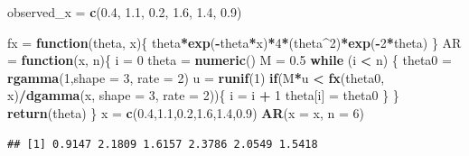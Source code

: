 \documentclass[
]{article}
\newenvironment{Shaded}{\begin{snugshade}}{\end{snugshade}}
\newcommand{\ControlFlowTok}[1]{\textcolor[rgb]{0.13,0.29,0.53}{\textbf{#1}}}
\newcommand{\DataTypeTok}[1]{\textcolor[rgb]{0.13,0.29,0.53}{#1}}
\newcommand{\DecValTok}[1]{\textcolor[rgb]{0.00,0.00,0.81}{#1}}
\newcommand{\FloatTok}[1]{\textcolor[rgb]{0.00,0.00,0.81}{#1}}
\newcommand{\KeywordTok}[1]{\textcolor[rgb]{0.13,0.29,0.53}{\textbf{#1}}}
\newcommand{\NormalTok}[1]{#1}
\newcommand{\OperatorTok}[1]{\textcolor[rgb]{0.81,0.36,0.00}{\textbf{#1}}}
\newcommand{\StringTok}[1]{\textcolor[rgb]{0.31,0.60,0.02}{#1}}
\begin{document}
\begin{Shaded}
\begin{Highlighting}[]
\NormalTok{observed_x =}\StringTok{ }\KeywordTok{c}\NormalTok{(}\FloatTok{0.4}\NormalTok{, }\FloatTok{1.1}\NormalTok{, }\FloatTok{0.2}\NormalTok{, }\FloatTok{1.6}\NormalTok{, }\FloatTok{1.4}\NormalTok{, }\FloatTok{0.9}\NormalTok{)}

\NormalTok{fx =}\StringTok{ }\ControlFlowTok{function}\NormalTok{(theta, x)\{}
\NormalTok{  theta}\OperatorTok{*}\KeywordTok{exp}\NormalTok{(}\OperatorTok{-}\NormalTok{theta}\OperatorTok{*}\NormalTok{x)}\OperatorTok{*}\DecValTok{4}\OperatorTok{*}\NormalTok{(theta}\OperatorTok{^}\DecValTok{2}\NormalTok{)}\OperatorTok{*}\KeywordTok{exp}\NormalTok{(}\OperatorTok{-}\DecValTok{2}\OperatorTok{*}\NormalTok{theta)}
\NormalTok{\}}
\NormalTok{AR =}\StringTok{ }\ControlFlowTok{function}\NormalTok{(x, n)\{}
\NormalTok{  i =}\StringTok{ }\DecValTok{0}
\NormalTok{  theta =}\StringTok{ }\KeywordTok{numeric}\NormalTok{()}
\NormalTok{  M =}\StringTok{ }\FloatTok{0.5}
  \ControlFlowTok{while}\NormalTok{ (i }\OperatorTok{<}\StringTok{ }\NormalTok{n) \{}
\NormalTok{    theta0 =}\StringTok{ }\KeywordTok{rgamma}\NormalTok{(}\DecValTok{1}\NormalTok{,}\DataTypeTok{shape =} \DecValTok{3}\NormalTok{, }\DataTypeTok{rate =} \DecValTok{2}\NormalTok{)}
\NormalTok{    u =}\StringTok{ }\KeywordTok{runif}\NormalTok{(}\DecValTok{1}\NormalTok{)}
    \ControlFlowTok{if}\NormalTok{(M}\OperatorTok{*}\NormalTok{u }\OperatorTok{<}\StringTok{ }\KeywordTok{fx}\NormalTok{(theta0, x)}\OperatorTok{/}\KeywordTok{dgamma}\NormalTok{(x, }\DataTypeTok{shape =} \DecValTok{3}\NormalTok{, }\DataTypeTok{rate =} \DecValTok{2}\NormalTok{))\{}
\NormalTok{      i =}\StringTok{ }\NormalTok{i }\OperatorTok{+}\StringTok{ }\DecValTok{1}
\NormalTok{      theta[i] =}\StringTok{ }\NormalTok{theta0}
\NormalTok{    \}}
\NormalTok{  \}}
  \KeywordTok{return}\NormalTok{(theta)}
\NormalTok{\}}
\NormalTok{x =}\StringTok{ }\KeywordTok{c}\NormalTok{(}\FloatTok{0.4}\NormalTok{,}\FloatTok{1.1}\NormalTok{,}\FloatTok{0.2}\NormalTok{,}\FloatTok{1.6}\NormalTok{,}\FloatTok{1.4}\NormalTok{,}\FloatTok{0.9}\NormalTok{)}
\KeywordTok{AR}\NormalTok{(}\DataTypeTok{x =}\NormalTok{ x, }\DataTypeTok{n =} \DecValTok{6}\NormalTok{)}
\end{Highlighting}
\end{Shaded}

\begin{verbatim}
## [1] 0.9147 2.1809 1.6157 2.3786 2.0549 1.5418
\end{verbatim}
\end{document}
